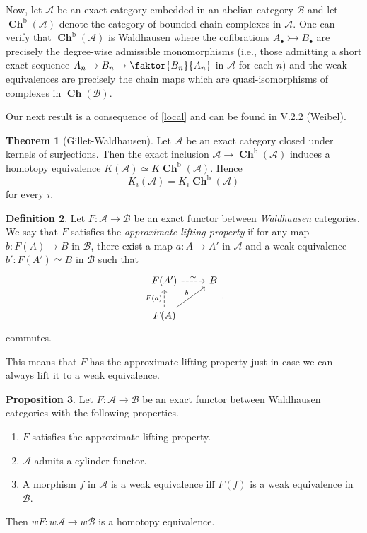 \documentclass[10pt,letterpaper,cm]{nupset}
\theoremstyle{definition}
\newtheorem{definition}{Definition}[section]
\theoremstyle{theorem}
\newtheorem{theorem}[definition]{Theorem}
\newtheorem{prop}[definition]{Proposition}
\theoremstyle{remark}
\newcommand{\1}{\mathbf{1}}
\renewcommand{\a}{\mathscr{A}}
\renewcommand{\b}{\mathscr{B}}
\newcommand{\0}{\vec 0}
\DeclareMathOperator{\bo}{b}
\DeclareMathOperator{\ch}{\mathbf{Ch}}
\begin{document}
\smallskip

Now, let $\a$ be an exact category embedded in an abelian category $\b$ and let $\ch^{\bo}(\a)$ denote the category of bounded chain complexes in $\a$. One can verify that $\ch^{\bo}(\a)$ is Waldhausen where the cofibrations $A_{\bullet} \rightarrowtail B_{\bullet}$ are precisely the degree-wise admissible monomorphisms (i.e., those admitting a short exact sequence $A_n \to B_n \to \faktor{B_n}{A_n}$ in $\a$ for each $n$) and the weak equivalences are precisely the chain maps which are quasi-isomorphisms of complexes in $\ch(\b)$.

\medskip

Our next result is a consequence of \cref{local} and can be found in V.2.2 (Weibel).

\begin{theorem}[Gillet-Waldhausen]\label{GW}
Let $\a$ be an exact category closed under kernels of surjections. Then the exact inclusion $\a \to \ch^{\bo}(\a)$ induces a homotopy equivalence $K(\a) \simeq K\ch^{\bo}(\a)$. Hence $$K_i(\a) = K_i \ch^{\bo}(\a)$$ for every $i$.
\end{theorem}

\begin{definition}
Let $F: \a \to \b$ be an exact functor between \emph{Waldhausen} categories. We say that $F$ satisfies the \textit{approximate lifting property} if for any map $b: F(A) \to B$ in $\b$, there exist a map $a : A \to A'$ in $\a$ and a weak equivalence $b' : F(A') \simeq B$ in $\b$ such that
\[
\begin{tikzcd}
F(A') \arrow[r, "\sim", dashed] & B \\
F(A) \arrow[u, "F(a)", dashed] \arrow[ru, "b"] & 
\end{tikzcd}.
\]
commutes.
\end{definition}

This means that $F$ has the approximate lifting property just in case we can always lift it to  a weak equivalence.

\begin{prop}\label{pp}
Let $F: \a \to \b$ be an exact functor between Waldhausen categories with the following properties.
\begin{enumerate}
\item $F$ satisfies the approximate lifting property.
\item $\a$ admits a cylinder functor.
\item A morphism $f$ in $\a$ is a weak equivalence iff $F(f)$ is a weak equivalence in $\b$.
\end{enumerate}
Then $wF : w{\a} \to w{\b}$ is a homotopy equivalence.
\end{prop}
\end{document}

